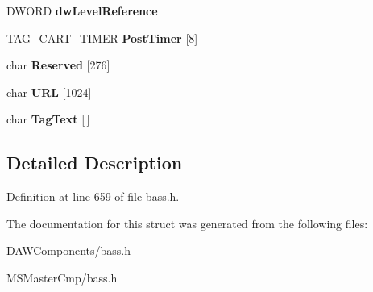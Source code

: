\begin{DoxyCompactItemize}
\item 
\hypertarget{struct_t_a_g___c_a_r_t_a3776ebc4bdd93cbfc5bb08e101a508fa_a3776ebc4bdd93cbfc5bb08e101a508fa}{D\-W\-O\-R\-D {\bfseries dw\-Level\-Reference}}\label{struct_t_a_g___c_a_r_t_a3776ebc4bdd93cbfc5bb08e101a508fa_a3776ebc4bdd93cbfc5bb08e101a508fa}

\item 
\hypertarget{struct_t_a_g___c_a_r_t_af0e070947244da684158dc1de513a2d1_af0e070947244da684158dc1de513a2d1}{\hyperlink{struct_t_a_g___c_a_r_t___t_i_m_e_r}{T\-A\-G\-\_\-\-C\-A\-R\-T\-\_\-\-T\-I\-M\-E\-R} {\bfseries Post\-Timer} \mbox{[}8\mbox{]}}\label{struct_t_a_g___c_a_r_t_af0e070947244da684158dc1de513a2d1_af0e070947244da684158dc1de513a2d1}

\item 
\hypertarget{struct_t_a_g___c_a_r_t_a38493fd6de87cc11b4764f72e97f2345_a38493fd6de87cc11b4764f72e97f2345}{char {\bfseries Reserved} \mbox{[}276\mbox{]}}\label{struct_t_a_g___c_a_r_t_a38493fd6de87cc11b4764f72e97f2345_a38493fd6de87cc11b4764f72e97f2345}

\item 
\hypertarget{struct_t_a_g___c_a_r_t_ae320e3568130ab502f0a552200029495_ae320e3568130ab502f0a552200029495}{char {\bfseries U\-R\-L} \mbox{[}1024\mbox{]}}\label{struct_t_a_g___c_a_r_t_ae320e3568130ab502f0a552200029495_ae320e3568130ab502f0a552200029495}

\item 
\hypertarget{struct_t_a_g___c_a_r_t_a5001ddf47b6e12aca5781d6420bbfe75_a5001ddf47b6e12aca5781d6420bbfe75}{char {\bfseries Tag\-Text} \mbox{[}$\,$\mbox{]}}\label{struct_t_a_g___c_a_r_t_a5001ddf47b6e12aca5781d6420bbfe75_a5001ddf47b6e12aca5781d6420bbfe75}

\end{DoxyCompactItemize}


\subsection{Detailed Description}


Definition at line 659 of file bass.\-h.



The documentation for this struct was generated from the following files\-:\begin{DoxyCompactItemize}
\item 
D\-A\-W\-Components/bass.\-h\item 
M\-S\-Master\-Cmp/bass.\-h\end{DoxyCompactItemize}
